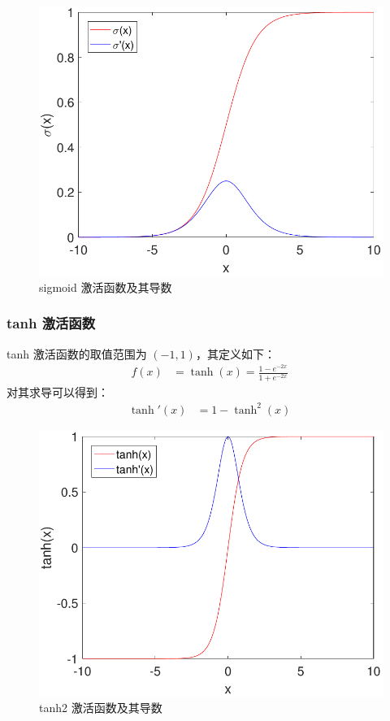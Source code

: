 \begin{figure}[hbt]
	\centering
	\includegraphics[width=\textwidth]{figures/networks/sigmoid}
	\caption{sigmoid 激活函数及其导数}
	\label{fig:sigmoid}
\end{figure}

\subsubsection{ tanh 激活函数}

tanh 激活函数的取值范围为 $(-1,1)$，其定义如下：
\begin{align}
f(x)&=\tanh(x)=\frac{1-e^{-2x}}{1+e^{-2x}}\;
\end{align}
对其求导可以得到：
\begin{align}
\tanh'(x)&=1-\tanh^2(x)\;
\end{align}

\begin{figure}[!t]
	\centering
	\includegraphics[width=\textwidth]{figures/networks/tanh2}
	\caption{tanh2 激活函数及其导数}
	\label{fig:tanh2}
\end{figure}

